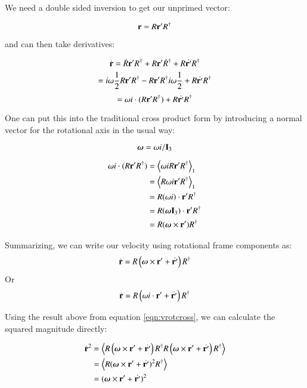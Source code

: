 \documentclass{article}      %
\newcommand{\dt}[1]{\dot{#1}}
\newcommand{\gpgradeone}[1] {{\left\langle{{#1}}\right\rangle}_{1}}
\newcommand{\gpscalargrade}[1] {{\left\langle{{#1}}\right\rangle}}
\begin{document}
We need a double sided inversion to get our unprimed vector:

\[
\mathbf{r} = R \mathbf{r}' R^\dagger
\]

and can then take derivatives:

\[
\dt{\Br} = 
\dt{R} \Br' R^\dagger
+{R} {\Br'} \dt{R}^\dagger
+{R} \dt{\Br'} R^\dagger
\]
\[
= 
i\omega \inv{2} {R} \Br' R^\dagger
- {R} \Br' R^\dagger i\omega\inv{2}
+{R} \dt{\Br'} R^\dagger
\]
\[
= 
\omega i \cdot ({R} \Br' R^\dagger) +  {R} \dt{\Br'} R^\dagger
\]

One can put this into the traditional cross product form by introducing
a normal vector for the rotational axis in the usual way:

\[
\boldsymbol{\omega} = \omega i / \mathbf{I}_3
\]

\begin{align*}
\omega i \cdot ({R} \Br' R^\dagger)
&= \gpgradeone{ \omega i {R} \Br' R^\dagger } \\
&= \gpgradeone{ {R} \omega i \Br' R^\dagger } \\
&= {R} (\omega i) \cdot \Br' R^\dagger \\
&= {R} (\Bomega \BI_3) \cdot \Br' R^\dagger \\
&= {R} (\Bomega \cross \Br') R^\dagger \\
\end{align*}

Summarizing, we can write our velocity using rotational frame components
as: 
\begin{equation}\label{eqn:vrotcross}
\dt{\Br} = {R} \left( \Bomega \cross \Br' + \dt{\Br'} \right) R^\dagger
\end{equation}
Or
\begin{equation}
\dt{\Br} = {R} \left( \omega i \cdot \Br' + \dt{\Br'} \right) R^\dagger
\end{equation}

Using the result above from equation \ref{eqn:vrotcross}, we can calculate
the squared magnitude directly:

\begin{align*}
\dt{\Br} ^2 
&= \gpscalargrade{ 
{R} \left( \Bomega \cross \Br' + \dt{\Br'} \right) R^\dagger
{R} \left( \Bomega \cross \Br' + \dt{\Br'} \right) R^\dagger
} \\
&= \gpscalargrade{ 
{R} ( \Bomega \cross \Br' + \dt{\Br'} ) ^2 R^\dagger
} \\
&= ( \Bomega \cross \Br' + \dt{\Br'} ) ^2 \\
\end{align*}
\end{document}
